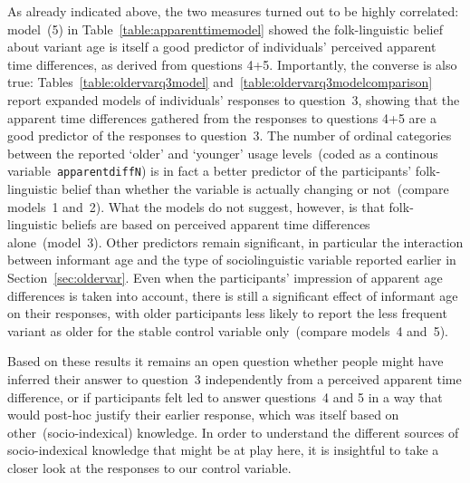 As already indicated above, the two measures turned out to be highly correlated: model~(5) in Table~\ref{table:apparenttimemodel} showed the folk-linguistic belief about variant age is itself a good predictor of individuals' perceived apparent time differences, as derived from questions 4+5.
Importantly, the converse is also true: Tables~\ref{table:oldervarq3model} and~\ref{table:oldervarq3modelcomparison} report expanded models of individuals' responses to question~3, showing that the apparent time differences gathered from the responses to questions 4+5 are a good predictor of the responses to question~3. The number of ordinal categories between the reported `older' and `younger' usage levels~(coded as a continous variable~\texttt{apparentdiffN}) is in fact a better predictor of the participants' folk-linguistic belief than whether the variable is actually changing or not~(compare models~1 and~2).
What the models do not suggest, however, is that folk-linguistic beliefs are based on perceived apparent time differences alone~(model~3). Other predictors remain significant, in particular the interaction between informant age and the type of sociolinguistic variable reported earlier in Section~\ref{sec:oldervar}. Even when the participants' impression of apparent age differences is taken into account, there is still a significant effect of informant age on their responses, with older participants less likely to report the less frequent variant as older for the stable control variable only~(compare models~4 and~5).

Based on these results it remains an open question whether people might have inferred their answer to question~3 independently from a perceived apparent time difference, or if participants felt led to answer questions~4 and 5 in a way that would post-hoc justify their earlier response, which was itself based on other~(socio-indexical) knowledge.
In order to understand the different sources of socio-indexical knowledge that might be at play here, it is insightful to take a closer look at the responses to our control variable.


